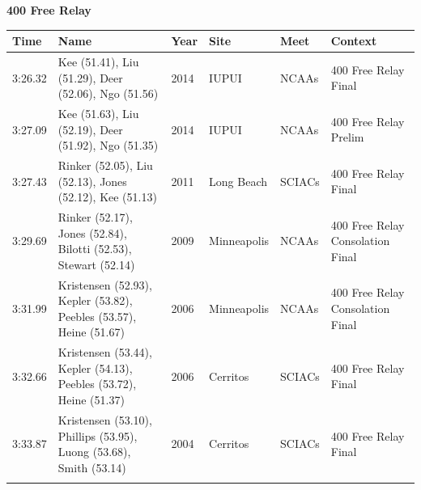 \vspace{1.2em}
\noindent\begin{minipage}[t]{0.98\textwidth}
\centering
\textbf{\textcolor{teamprimary}{400 Free Relay}}\par
\vspace{0.5em}
\centering
\small
\renewcommand{\arraystretch}{1.0}
\setlength{\tabcolsep}{4pt}
\begin{tabular}{@{}p{2.0cm}p{3.2cm}p{1.2cm}p{2.0cm}p{2.0cm}p{2.5cm}@{}}
\toprule
\textbf{Time} & \textbf{Name} & \textbf{Year} & \textbf{Site} & \textbf{Meet} & \textbf{Context} \\
\midrule
3:26.32 & Kee (51.41), Liu (51.29), Deer (52.06), Ngo (51.56) & 2014 & IUPUI & NCAAs & 400 Free Relay Final \\
3:27.09 & Kee (51.63), Liu (52.19), Deer (51.92), Ngo (51.35) & 2014 & IUPUI & NCAAs & 400 Free Relay Prelim \\
3:27.43 & Rinker (52.05), Liu (52.13), Jones (52.12), Kee (51.13) & 2011 & Long Beach & SCIACs & 400 Free Relay Final \\
3:29.69 & Rinker (52.17), Jones (52.84), Bilotti (52.53), Stewart (52.14) & 2009 & Minneapolis & NCAAs & 400 Free Relay Consolation Final \\
3:31.99 & Kristensen (52.93), Kepler (53.82), Peebles (53.57), Heine (51.67) & 2006 & Minneapolis & NCAAs & 400 Free Relay Consolation Final \\
3:32.66 & Kristensen (53.44), Kepler (54.13), Peebles (53.72), Heine (51.37) & 2006 & Cerritos & SCIACs & 400 Free Relay Final \\
3:33.87 & Kristensen (53.10), Phillips (53.95), Luong (53.68), Smith (53.14) & 2004 & Cerritos & SCIACs & 400 Free Relay Final \\
\bottomrule
\vspace{0.5em}
\end{tabular}
\end{minipage}
\vspace{1.2em}
